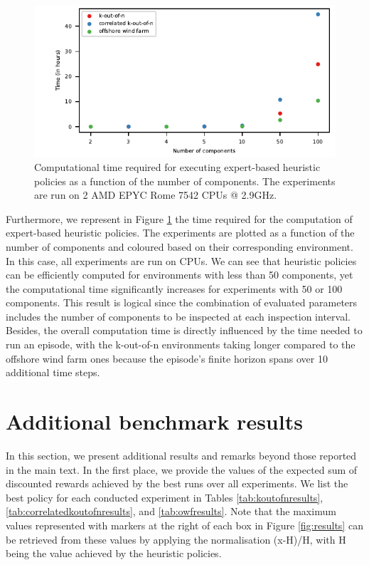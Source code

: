\begin{figure}
    \centering
    \includegraphics[width=.6\textwidth]{tex_thesis/figures/ch5/heur_cpu_time.pdf}
    \caption{Computational time required for executing expert-based heuristic policies as a function of the number of components. The experiments are run on 2 AMD EPYC Rome 7542 CPUs @ 2.9GHz.}
    \label{fig:heur_time_cpu}
\end{figure}
Furthermore, we represent in Figure \ref{fig:heur_time_cpu} the time required for the computation of expert-based heuristic policies. The experiments are plotted as a function of the number of components and coloured based on their corresponding environment. In this case, all experiments are run on CPUs. We can see that heuristic policies can be efficiently computed for environments with less than 50 components, yet the computational time significantly increases for experiments with 50 or 100 components. This result is logical since the combination of evaluated parameters includes the number of components to be inspected at each inspection interval. Besides, the overall computation time is directly influenced by the time needed to run an episode, with the k-out-of-n environments taking longer compared to the offshore wind farm ones because the episode's finite horizon spans over 10 additional time steps. 


\section{Additional benchmark results}
\label{sec:ch5_appendix_add_results}
In this section, we present additional results and remarks beyond those reported in the main text.
In the first place, we provide the values of the expected sum of discounted rewards achieved by the best runs over all experiments.
We list the best policy for each conducted experiment in Tables \ref{tab:koutofnresults}, \ref{tab:correlatedkoutofnresults}, and \ref{tab:owfresults}.
Note that the maximum values represented with markers at the right of each box in Figure \ref{fig:results} can be retrieved from these values by applying the normalisation (x-H)/H, with H being the value achieved by the heuristic policies.

